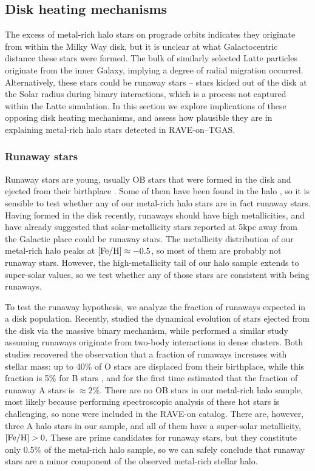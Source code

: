 \documentclass[apj, twocolappendix, numberedappendix, appendixfloats]{emulateapj}
\begin{document}
\subsection{Disk heating mechanisms}
\label{sec:diskheating}
The excess of metal-rich halo stars on prograde orbits indicates they originate from within the Milky Way disk, but it is unclear at what Galactocentric distance these stars were formed.
The bulk of similarly selected Latte particles originate from the inner Galaxy, implying a degree of radial migration occurred.
Alternatively, these stars could be runaway stars -- stars kicked out of the disk at the Solar radius during binary interactions, which is a process not captured within the Latte simulation.
In this section we explore implications of these opposing disk heating mechanisms, and assess how plausible they are in explaining metal-rich halo stars detected in RAVE-on--TGAS.

\subsubsection{Runaway stars}
\label{sec:runaway}
Runaway stars are young, usually OB stars that were formed in the disk and ejected from their birthplace \citep{blaauw1961}.
Some of them have been found in the halo \citep[e.g.,][]{conlon1990}, so it is sensible to test whether any of our metal-rich halo stars are in fact runaway stars.
Having formed in the disk recently, runaways should have high metallicities, and \citet{bromley2009} have already suggested that solar-metallicity stars reported at 5\;kpc away from the Galactic place \citep{ivezic2008} could be runaway stars.
The metallicity distribution of our metal-rich halo peaks at $\rm[Fe/H]\approx-0.5$, so most of them are probably not runaway stars.
However, the high-metallicity tail of our halo sample extends to super-solar values, so we test whether any of those stars are consistent with being runaways.

To test the runaway hypothesis, we analyze the fraction of runaways expected in a disk population.
Recently, \citet{bromley2009} studied the dynamical evolution of stars ejected from the disk via the massive binary mechanism, while \citet{perets2012} performed a similar study assuming runaways originate from two-body interactions in dense clusters.
Both studies recovered the observation that a fraction of runaways increases with stellar mass: up to 40\% of O stars are displaced from their birthplace, while this fraction is 5\% for B stars \citep{blaauw1961, gies1986}, and for the first time estimated that the fraction of runaway A stars is $\approx2\%$.
There are no OB stars in our metal-rich halo sample, most likely because performing spectroscopic analysis of these hot stars is challenging, so none were included in the RAVE-on catalog.
There are, however, three A halo stars in our sample, and all of them have a super-solar metallicity, $\rm[Fe/H]>0$.
These are prime candidates for runaway stars, but they constitute only 0.5\% of the metal-rich halo sample, so we can safely conclude that runaway stars are a minor component of the observed metal-rich stellar halo.
\end{document}
